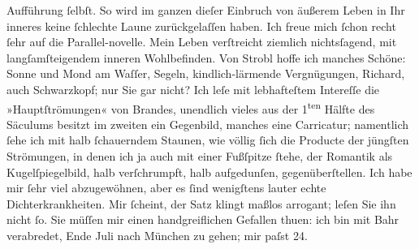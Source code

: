 \begin{ledgroupsized}[t]{13cm}
                    Aufführung ſelbſt. So wird im ganzen dieſer Einbruch von äußerem Leben in Ihr
                    inneres keine ſchlechte Laune zurückgelaſſen haben.\pend
           \pstart
           {\pb}Ich freue mich ſchon recht
                    ſehr auf die Parallel-novelle.\pend
           \pstart
           Mein Leben verſtreicht ziemlich nichtsſagend, mit \introOben{}langſam\introOben{}{ }ſteigendem inneren Wohlbefinden. Von Strobl hoffe ich manches Schöne: Sonne und Mond
                    am Waſſer, Segeln, kindlich-lärmende Vergnügungen, Richard, auch Schwarzkopf; nur Sie gar nicht?\pend
           \pstart
           Ich leſe mit lebhafteſtem Intereſſe die »Hauptſtrömungen« von Brandes,
                    unendlich vieles aus der 1\textsuperscript{ten} Hälfte des Säculums
                    besitzt im zweiten ein Gegenbild, manches eine Carricatur; namentlich ſehe ich
                    mit halb ſchauerndem Staunen, {\pb}wie völlig ſich die \introOben{}Producte der\introOben{} jüngſten Strömungen,
                    in denen ich ja auch mit einer Fußſpitze ſtehe, der Romantik als
                    Kugelſpiegelbild, halb verſchrumpft, halb aufgedunſen, gegenüberſtellen.\pend
           \pstart
           Ich habe mir ſehr viel abzugewöhnen, aber es ſind wenigſtens lauter echte
                    Dichterkrankheiten.\pend
           \pstart
           Mir ſcheint, der Satz klingt maßlos arrogant; leſen Sie ihn nicht ſo.\pend
           \pstart
           Sie müſſen mir einen handgreiflichen Gefallen thuen: ich bin mit Bahr verabredet, Ende Juli nach München zu gehen; mir paſst 24.

\end{ledgroupsized}
